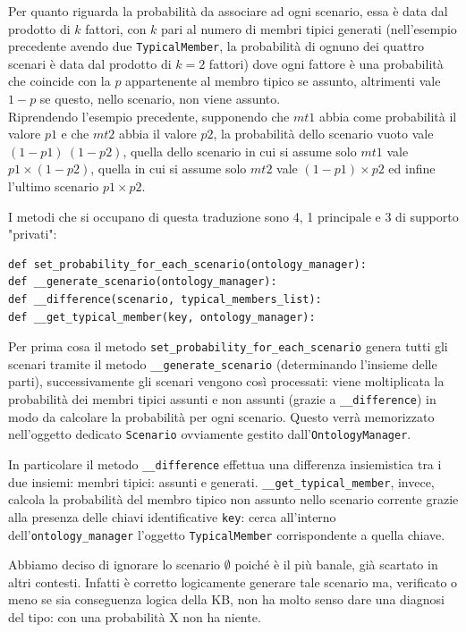 Per quanto riguarda la probabilità da associare ad ogni scenario, essa è data dal 
prodotto di $ k $ fattori, con $ k $ pari al numero di membri tipici generati (nell’esempio
precedente avendo due \texttt{TypicalMember}, la probabilità di ognuno dei 
quattro scenari è data dal prodotto di $ k = 2 $ fattori) dove ogni fattore è una probabilità 
che coincide con la $ p $ appartenente al membro tipico  se assunto, 
altrimenti vale $ 1 - p $ se questo, nello scenario, non viene assunto.\\
Riprendendo l’esempio precedente, supponendo che $ mt1 $ abbia come probabilità il valore $ p1 $ 
e che $ mt2 $ abbia il valore $ p2 $, la probabilità dello scenario vuoto vale $ ( 1 - p1) \ ( 1 - p2)$,
quella dello scenario in cui si assume solo $ mt1 $ vale $ p1 \times ( 1 - p2) $, 
quella in cui si assume solo $ mt2 $ vale $ ( 1 - p1) \times p2 $ ed infine l’ultimo scenario $ p1 \times p2 $.

I metodi che si occupano di questa traduzione sono 4, 1 principale e 3 di supporto "privati":
\begin{verbatim}
def set_probability_for_each_scenario(ontology_manager):
def __generate_scenario(ontology_manager):
def __difference(scenario, typical_members_list):
def __get_typical_member(key, ontology_manager):
\end{verbatim}
Per prima cosa il metodo \texttt{set_probability_for_each_scenario} 
genera tutti gli scenari tramite il metodo \texttt{__generate_scenario} (determinando
l’insieme delle parti), successivamente gli scenari vengono così processati:
viene moltiplicata la probabilità dei membri tipici assunti e non assunti 
(grazie a \texttt{__difference}) in modo da calcolare la probabilità per ogni scenario.
Questo verrà memorizzato nell'oggetto dedicato \texttt{Scenario}
 ovviamente gestito dall'\texttt{OntologyManager}.

In particolare il metodo \texttt{__difference} effettua una 
differenza insiemistica tra i due insiemi: membri tipici: assunti e generati. 
\texttt{__get_typical_member}, invece, calcola la probabilità del membro tipico non assunto
nello scenario corrente grazie alla presenza delle chiavi identificative \texttt{key}:
cerca all'interno dell'\texttt{ontology_manager} l’oggetto \texttt{TypicalMember} corrispondente a quella chiave.

Abbiamo deciso di ignorare lo scenario $ \emptyset $ poiché è il più banale, già scartato in altri contesti.
Infatti è corretto logicamente generare tale scenario ma, verificato o meno se sia conseguenza logica della KB,
non ha molto senso dare una diagnosi del tipo: con una probabilità X non ha niente.

